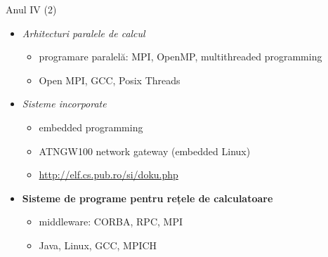 \documentclass{beamer}
\begin{document}

\begin{frame}{Anul IV (2)}
	\begin{itemize}
		\item \textit{Arhitecturi paralele de calcul}
			\begin{itemize}
				\item programare paralelă: MPI, OpenMP, multithreaded
				programming
				\item Open MPI, GCC, Posix Threads
			\end{itemize}
		\item \textit{Sisteme incorporate}
			\begin{itemize}
				\item embedded programming
				\item ATNGW100 network gateway (embedded Linux)
				\item \url{http://elf.cs.pub.ro/si/doku.php}
			\end{itemize}
		\item \textbf{Sisteme de programe pentru rețele de calculatoare}
			\begin{itemize}
				\item middleware: CORBA, RPC, MPI
				\item Java, Linux, GCC, MPICH
			\end{itemize}
	\end{itemize}
\end{frame}
\end{document}
